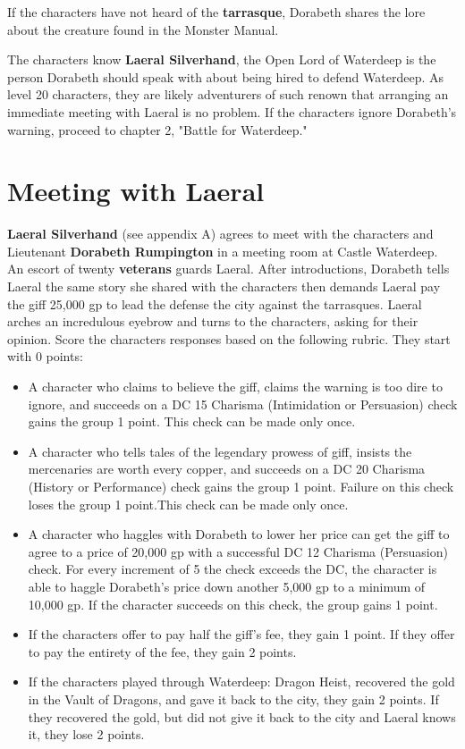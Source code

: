 \documentclass[10pt,a4paper,twoside,bg=print,twocolumn,openany,nodeprecatedcode]{dndbook}
\begin{document}
If the characters have not heard of the \textbf{tarrasque}, Dorabeth shares the lore about the creature found in the Monster Manual.

The characters know \textbf{Laeral Silverhand}, the Open Lord of Waterdeep is the person Dorabeth should speak with about being hired to defend Waterdeep. As level 20 characters, they are likely adventurers of such renown that arranging an immediate meeting with Laeral is no problem. If the characters ignore Dorabeth's warning, proceed to chapter 2, "Battle for Waterdeep."

\section{Meeting with Laeral}
\textbf{Laeral Silverhand} (see appendix A) agrees to meet with the characters and Lieutenant \textbf{Dorabeth Rumpington} in a meeting room at Castle Waterdeep. An escort of twenty \textbf{veterans} guards Laeral. After introductions, Dorabeth tells Laeral the same story she shared with the characters then demands Laeral pay the giff 25,000 gp to lead the defense the city against the tarrasques. Laeral arches an incredulous eyebrow and turns to the characters, asking for their opinion. Score the characters responses based on the following rubric. They start with 0 points:


\begin{itemize}
\item A character who claims to believe the giff, claims the warning is too dire to ignore, and succeeds on a DC 15 Charisma (Intimidation or Persuasion) check gains the group 1 point. This check can be made only once.
\item A character who tells tales of the legendary prowess of giff, insists the mercenaries are worth every copper, and succeeds on a DC 20 Charisma (History or Performance) check gains the group 1 point. Failure on this check loses the group 1 point.This check can be made only once.
\item A character who haggles with Dorabeth to lower her price can get the giff to agree to a price of 20,000 gp with a successful DC 12 Charisma (Persuasion) check. For every increment of 5 the check exceeds the DC, the character is able to haggle Dorabeth's price down another 5,000 gp to a minimum of 10,000 gp. If the character succeeds on this check, the group gains 1 point.
\item If the characters offer to pay half the giff's fee, they gain 1 point. If they offer to pay the entirety of the fee, they gain 2 points.
\item If the characters played through Waterdeep:  Dragon Heist, recovered the gold in the Vault of  Dragons, and gave it back to the city, they gain 2 points. If they recovered the gold, but did not give it back to the city and Laeral knows it, they lose 2 points.
\end{itemize}
\end{document}
